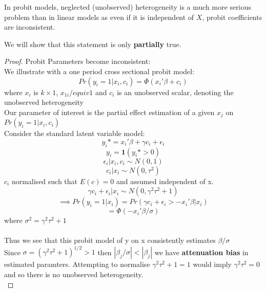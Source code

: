 \documentclass[DIV=14,titlepage=false]{scrreprt}
\begin{document}
\begin{prop}
    In probit models, neglected (unobserved) heterogeneity is a much more serious problem than in linear models as even if it is independent of \(X\), probit coefficients are inconsistent.\\
\end{prop}
\vspace{5mm}
We will show that this statement is only \textbf{partially} true.\\
\begin{proof} Probit Parameters become inconsistent:\\
We illustrate with a one period cross sectional probit model:
\[Pr(y_i=1|x_i,c_i)=\Phi(x_i'\beta+c_i)\]
where \(x_i\) is \(k \times 1\), \(x_{1i}/equiv1\) and \(c_i\) is an unobserved scalar, denoting the unobserved heterogeneity\\
Our parameter of interest is the partial effect estimation of a given \(x_j\) on \(Pr(y_i=1|x_i,c_i)\)\\

Consider the standard latent variable model:
\[y_i*=x_i'\beta+\gamma c_i+\epsilon_i\]
\[y_i=\textbf{1}(y_i*>0)\]
\[\epsilon_i|x_i,c_i\sim N(0,1)\]
\[c_i|x_i \sim N(0,\tau^2)\]
\(c_i\) normalised such that \(E(c)=0\) and assumed independent of x.
\[\gamma c_i + \epsilon_i|x_i \sim N(0, \gamma^2\tau^2+1)\]
\[\implies Pr(y_i=1|x_i) = Pr(\gamma c_i + \epsilon_i>-x_i'\beta|x_i)\]
\[=\Phi(-x_i'\beta/\sigma)\]
where \(\sigma^2=\gamma^2\tau^2+1\)\\ \\
Thus we see that this probit model of y on x consistently estimates \(\beta/\sigma\)\\
Since \(\sigma=(\gamma^2\tau^2+1)^{1/2}>1\) then \(|\beta_j/\sigma|<|\beta_j|\) we have \textbf{attenuation bias} in estimated paramters.
Attempting to normalise \(\gamma^2\tau^2+1=1\) would imply \(\gamma^2\tau^2=0\) and so there is no unobserved heterogeneity.\\
\end{proof}
\vspace{5mm}
\end{document}

